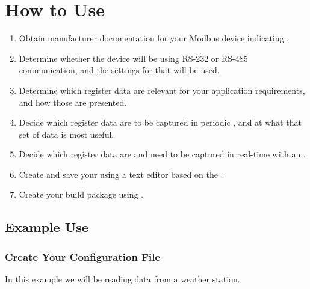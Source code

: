 \documentclass[letterpaper,10pt,english]{sphinxmanual}
\begin{document}
\section{How to Use}
\label{\detokenize{usage:how-to-use}}\label{\detokenize{usage::doc}}\begin{enumerate}
\item {} 
Obtain manufacturer documentation for your Modbus device indicating {\hyperref[\detokenize{usage:modbus-register-definitions}]{}}.

\item {} 
Determine whether the device will be using RS-232 or RS-485 communication, and the settings for  that will be used.

\item {} 
Determine which register data  are relevant for your application requirements, and how those are presented.

\item {} 
Decide which register data are to be captured in periodic , and at what  that set of data is most useful.

\item {} 
Decide which register data are  and need to be captured in real-time with an .

\item {} 
Create and save your   using a text editor based on the {\hyperref[\detokenize{usage:config-file-template}]{}}.

\item {} 
Create your build package using {\hyperref[\detokenize{usage:solution-studio-package}]{}}.

\end{enumerate}


\subsection{Example Use}
\label{\detokenize{usage:example-use}}

\subsubsection{Create Your Configuration File}
\label{\detokenize{usage:create-your-configuration-file}}
In this example we will be reading data from a weather station.
\end{document}
